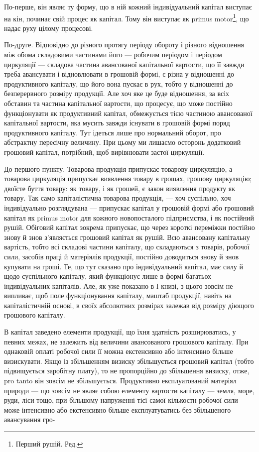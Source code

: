 По-перше, він являє ту форму, що в ній кожний індивідуальний капітал
виступає на кін, починає свій процес як капітал. Тому він виступає
як primus motor\footnote*{
Перший рушій. Ред.
}, що надає руху цілому процесові.

По-друге. Відповідно до різного протягу періоду обороту і різного
відношення між обома складовими частинами його — робочим періодом і
періодом циркуляції — складова частина авансованої капітальної вартости,
що її завжди треба авансувати і відновлювати в грошовій формі, є різна
у відношенні до продуктивного капіталу, що його вона пускає в рух,
тобто у відношенні до безперервного розміру продукції. Але хоч яке
це буде відношення, за всіх обставин та частина капітальної вартости,
що процесує, що може постійно функціонувати як продуктивний капітал,
обмежується тією частиною авансованої капітальної вартости, яка мусить
завжди існувати в грошовій формі поряд продуктивного капіталу. Тут
ідеться лише про нормальний оборот, про абстрактну пересічну величину.
При цьому ми лишаємо осторонь додатковий грошовий капітал,
потрібний, щоб вирівнювати застої циркуляції.

До першого пункту. Товарова продукція припускає товарову
циркуляцію, а товарова циркуляція припускає виявлення товару в грошах,
грошову циркуляцію; двоїсте буття товару: як товару, і як грошей,
є закон виявлення продукту як товару. Так само капіталістична товарова
продукція, — хоч суспільно, хоч індивідуально розглядувана —
припускає капітал у грошовій формі або грошовий капітал як primus
motor для кожного новопосталого підприємства, і як постійний рушій. Обіговий
капітал зокрема припускає, що через короткі переміжки постійно
знову й знов з’являється грошовий капітал як рушій. Всю авансовану
капітальну вартість, тобто всі складові частини капіталу, що складаються
з товарів, робочої сили, засобів праці й матеріялів продукції, постійно
доводиться знову й знов купувати на гроші. Те, що тут сказано про індивідуальний
капітал, має силу й щодо суспільного капіталу, який функціонує
лише в формі багатьох індивідуальних капіталів. Але, як уже показано
в І книзі, з цього зовсім не випливає, щоб поле функціонування
капіталу, маштаб продукції, навіть на капіталістичній основі, в своїх
абсолютних розмірах залежав від розміру діющого грошового капіталу.

В капітал заведено елементи продукції, що їхня здатність розширюватись,
у певних межах, не залежить від величини авансованого грошового
капіталу. При однаковій оплаті робочої сили її можна екстенсивно
або інтенсивно більше визискувати. Якщо із збільшенням визиску збільшується
грошовий капітал (тобто підвищується заробітну плату), то не
пропорційно до збільшення визиску, отже, pro tanto він зовсім не збільшується.
Продуктивно експлуатований матеріял природи — що зовсім не являє
собою елементу вартости капіталу — земля, море, руди, ліси тощо, при
більшому напруженні тієї самої кількостн робочої сили може інтенсивно
або екстенсивно більше експлуатуватись без збільшеного авансування гро-